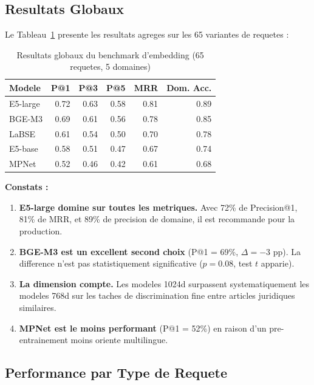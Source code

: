 \subsection{Resultats Globaux}

Le Tableau~\ref{tab:embed-results} presente les resultats agreges sur les 65 variantes de requetes :

\begin{table}[h]
\centering
\renewcommand{\arraystretch}{1.3}
\begin{tabular}{|l|r|r|r|r|r|}
\hline
\rowcolor{LightBlue}
\textbf{\color{PrimaryBlue}Modele} & \textbf{\color{PrimaryBlue}P@1} & \textbf{\color{PrimaryBlue}P@3} & \textbf{\color{PrimaryBlue}P@5} & \textbf{\color{PrimaryBlue}MRR} & \textbf{\color{PrimaryBlue}Dom. Acc.} \\
\hline
E5-large & 0.72 & 0.63 & 0.58 & 0.81 & 0.89 \\
BGE-M3 & 0.69 & 0.61 & 0.56 & 0.78 & 0.85 \\
LaBSE & 0.61 & 0.54 & 0.50 & 0.70 & 0.78 \\
E5-base & 0.58 & 0.51 & 0.47 & 0.67 & 0.74 \\
MPNet & 0.52 & 0.46 & 0.42 & 0.61 & 0.68 \\
\hline
\end{tabular}
\caption{Resultats globaux du benchmark d'embedding (65 requetes, 5 domaines)}
\label{tab:embed-results}
\end{table}

\textbf{Constats :}
\begin{enumerate}
    \item \textbf{E5-large domine sur toutes les metriques.} Avec 72\% de Precision@1, 81\% de MRR, et 89\% de precision de domaine, il est recommande pour la production.
    \item \textbf{BGE-M3 est un excellent second choix} (P@1 = 69\%, $\Delta = -3$ pp). La difference n'est pas statistiquement significative ($p = 0.08$, test $t$ apparie).
    \item \textbf{La dimension compte.} Les modeles 1024d surpassent systematiquement les modeles 768d sur les taches de discrimination fine entre articles juridiques similaires.
    \item \textbf{MPNet est le moins performant} (P@1 = 52\%) en raison d'un pre-entrainement moins oriente multilingue.
\end{enumerate}

\subsection{Performance par Type de Requete}

